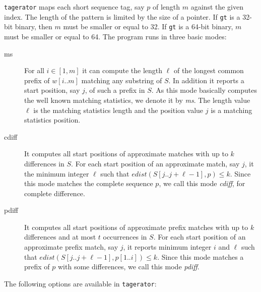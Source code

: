 \documentclass[12pt]{article}
\newcommand{\Substring}[3]{#1[#2..#3]}
\newcommand{\Program}[0]{\texttt{tagerator}\xspace}
\begin{document}
\Program maps each short sequence tag, say \(p\) of length \(m\)
against the given index. The length of the pattern is limited by the
size of a pointer. If \texttt{gt} is a 32-bit binary, then \(m\) must be
smaller or equal to 32. If \texttt{gt} is a 64-bit binary, \(m\) must be 
smaller or equal to 64. The program runs in three basic modes:
\begin{description}
\item[ms]
For all \(i\in[1,m]\) it can compute the length \(\ell\) of the longest common 
prefix of \(\Substring{w}{i}{m}\) matching any substring of \(S\).
In addition it reports a start position, say \(j\), of such a prefix in \(S\).
As this mode basically computes the well known matching statistics, we denote 
it by \textit{ms}. The length value \(\ell\) is the matching statistics length
and the position value \(j\) is a matching statistics position.
\item[cdiff]
It computes all start positions of approximate matches with up to \(k\)
differences in \(S\). For each start position of an approximate match,
say \(j\), it the minimum integer \(\ell\) such that
\(edist(\Substring{S}{j}{j+\ell-1},p)\leq k\). Since this mode matches
the complete sequence \(p\), we call this mode \textit{cdiff},
for complete difference.
\item[pdiff]
It computes all start positions of approximate prefix matches with up to \(k\)
differences and at most \(t\) occurrences in \(S\). For each start position 
of an approximate prefix match, say \(j\), it reports minimum integer \(i\) and
\(\ell\) such that 
\(edist(\Substring{S}{j}{j+\ell-1},\Substring{p}{1}{i})\leq k\). Since this 
mode matches a prefix of \(p\) with some differences, we call this mode 
\textit{pdiff}.
\end{description}

The following options are available in \Program:
\end{document}
